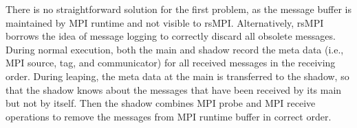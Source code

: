 There is no straightforward solution for the first problem, as the message buffer is maintained by MPI runtime and not visible to rsMPI. Alternatively, rsMPI borrows the idea of message logging to correctly discard all obsolete messages. During normal execution, both the main and shadow record the meta data (i.e., MPI source, tag, and communicator) for all received messages in the receiving order. During leaping, the meta data at the main is transferred to the shadow, so that the shadow knows about the messages that have been received by its main but not by itself. Then the shadow combines MPI probe and MPI receive operations to remove the messages from MPI runtime buffer in correct order. 






